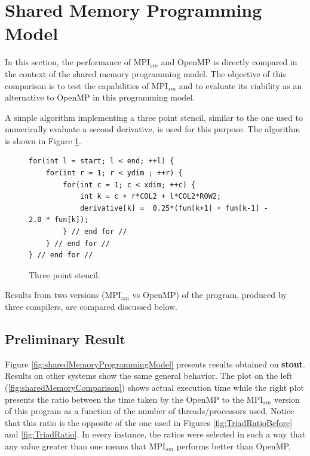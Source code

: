 \section{Shared Memory Programming Model}

In this section, the performance of MPI$_{sm}$ and OpenMP is directly compared in the context of the shared memory programming model. The objective of this comparison is to test the capabilities of MPI$_{sm}$ and to evaluate its viability as an alternative to OpenMP in this programming model.

\medskip

A simple algorithm implementing a three point stencil, similar to the one used to numerically evaluate a second derivative, is used for this purpose. The algorithm is shown in Figure \ref{fig:ThreePointStencil}.

\medskip
  
\begin{figure} [h!]
\centering
\captionsetup{justification=centering, singlelinecheck=false}
\begin{lstlisting}[style=CStyle]
for(int l = start; l < end; ++l) {
    for(int r = 1; r < ydim ; ++r) {
        for(int c = 1; c < xdim; ++c) {
            int k = c + r*COL2 + l*COL2*ROW2;
            derivative[k] =  0.25*(fun[k+1] + fun[k-1] - 2.0 * fun[k]);
        } // end for //
    } // end for //
} // end for //
\end{lstlisting}    
\caption{Three point stencil.}
\label{fig:ThreePointStencil}
\end{figure}

\medskip

Results from two versions (MPI$_{sm}$ vs OpenMP) of the program, produced by three compilers, are compared discussed below.

\subsection*{Preliminary Result}

Figure \ref{fig:sharedMemoryProgrammingModel} presents results obtained on \textbf{stout}. Results on other systems show the same general behavior. The plot on the left (\ref{fig:sharedMemoryComparison}) shows actual execution time while the right plot presents the ratio between the time taken by the OpenMP to the MPI$_{sm}$ version of this program as a function of the number of threads/processors used. Notice that this ratio is the opposite of the one used in Figures \ref{fig:TriadRatioBefore} and \ref{fig:TriadRatio}. In every instance, the ratios were selected in such a way that any value greater than one means that MPI$_{sm}$ performs better than OpenMP.



